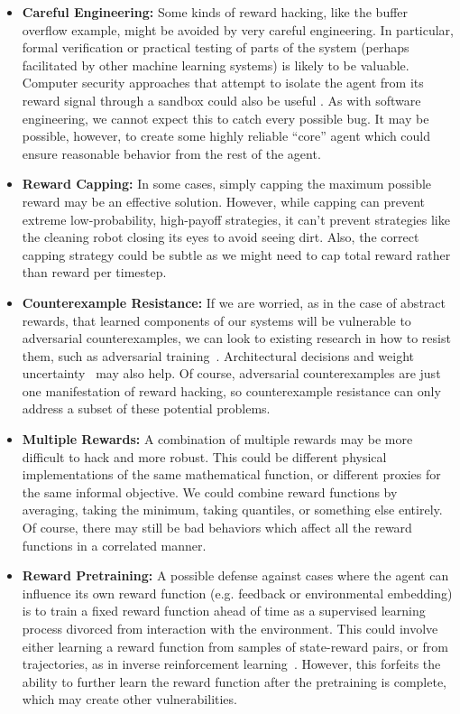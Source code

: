 \documentclass[a4paper,10pt]{article}
\begin{document}
\begin{itemize}
\item {\bf Careful Engineering:} Some kinds of reward hacking, like the buffer overflow example, might be avoided by very careful engineering. In particular, formal verification or practical testing of parts of the system (perhaps facilitated by other machine learning systems) is likely to be valuable.  Computer security approaches that attempt to isolate the agent from its reward signal through a sandbox could also be useful \cite{babcock2016agi}.  As with software engineering, we cannot expect this to catch every possible bug. It may be possible, however, to create some highly reliable “core” agent which could ensure reasonable behavior from the rest of the agent.

\item {\bf Reward Capping:} In some cases, simply capping the maximum possible reward may be an effective solution.  However, while capping can prevent extreme low-probability, high-payoff strategies, it can’t prevent strategies like the cleaning robot closing its eyes to avoid seeing dirt.  Also, the correct capping strategy could be subtle as we might need to cap total reward rather than reward per timestep.

\item {\bf Counterexample Resistance:} If we are worried, as in the case of abstract rewards, that learned components of our systems will be vulnerable to adversarial counterexamples, we can look to existing research in how to resist them, such as adversarial training~\cite{goodfellow2014explaining}. Architectural decisions and weight uncertainty~\cite{blundell2015weight} may also help. Of course, adversarial counterexamples are just one manifestation of reward hacking, so counterexample resistance can only address a subset of these potential problems.

\item {\bf Multiple Rewards:} A combination of multiple rewards \cite{deb2014multi} may be more difficult to hack and more robust.  This could be different physical implementations of the same mathematical function, or different proxies for the same informal objective. We could combine reward functions by averaging, taking the minimum, taking quantiles, or something else entirely.  Of course, there may still be bad behaviors which affect all the reward functions in a correlated manner.

\item {\bf Reward Pretraining:}  A possible defense against cases where the agent can influence its own reward function (e.g. feedback or environmental embedding) is to train a fixed reward function ahead of time as a supervised learning process divorced from interaction with the environment.  This could involve either learning a reward function from samples of state-reward pairs, or from trajectories, as in inverse reinforcement learning~\cite{ng2000algorithms,finn2016guided}.  However, this forfeits the ability to further learn the reward function after the pretraining is complete, which may create other vulnerabilities.


\end{itemize}
\end{document}
